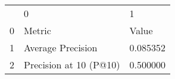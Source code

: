 \begin{tabular}{lll}
 & 0 & 1 \\
0 & Metric & Value \\
1 & Average Precision & 0.085352 \\
2 & Precision at 10 (P@10) & 0.500000 \\
\end{tabular}
